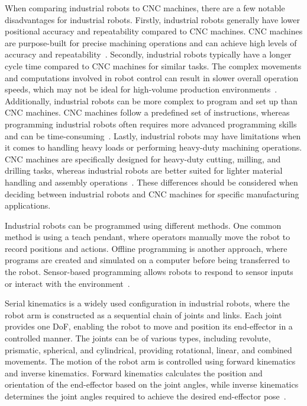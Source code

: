 When comparing industrial robots to CNC machines, there are a few notable disadvantages for industrial robots. Firstly, industrial robots generally have lower positional accuracy and repeatability compared to CNC machines. CNC machines are purpose-built for precise machining operations and can achieve high levels of accuracy and repeatability~\cite{Wang.2023}.
Secondly, industrial robots typically have a longer cycle time compared to CNC machines for similar tasks. The complex movements and computations involved in robot control can result in slower overall operation speeds, which may not be ideal for high-volume production environments~\cite{Joshi.2021}.
Additionally, industrial robots can be more complex to program and set up than CNC machines. CNC machines follow a predefined set of instructions, whereas programming industrial robots often requires more advanced programming skills and can be time-consuming~\cite{Ye.2022}. Lastly, industrial robots may have limitations when it comes to handling heavy loads or performing heavy-duty machining operations. CNC machines are specifically designed for heavy-duty cutting, milling, and drilling tasks, whereas industrial robots are better suited for lighter material handling and assembly operations~\cite{Wu.2022}. These differences should be considered when deciding between industrial robots and CNC machines for specific manufacturing applications.

Industrial robots can be programmed using different methods. One common method is using a teach pendant, where operators manually move the robot to record positions and actions. Offline programming is another approach, where programs are created and simulated on a computer before being transferred to the robot. Sensor-based programming allows robots to respond to sensor inputs or interact with the environment~\cite{Heimann.2020}. %


Serial kinematics is a widely used configuration in industrial robots, where the robot arm is constructed as a sequential chain of joints and links. Each joint provides one DoF, enabling the robot to move and position its end-effector in a controlled manner. The joints can be of various types, including revolute, prismatic, spherical, and cylindrical, providing rotational, linear, and combined movements. The motion of the robot arm is controlled using forward kinematics and inverse kinematics. Forward kinematics calculates the position and orientation of the end-effector based on the joint angles, while inverse kinematics determines the joint angles required to achieve the desired end-effector pose~\cite{Singh.2021b}. %


